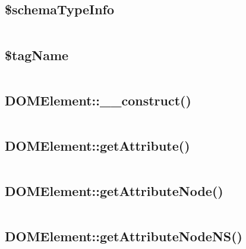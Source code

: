 \subsection{\$schemaTypeInfo}

\begin{lstlisting}[language=PHP]

\end{lstlisting}

\subsection{\$tagName}


\begin{lstlisting}[language=PHP]

\end{lstlisting}

\subsection{DOMElement::\_\_construct()}


\begin{lstlisting}[language=PHP]

\end{lstlisting}

\subsection{DOMElement::getAttribute()}

\begin{lstlisting}[language=PHP]

\end{lstlisting}

\subsection{DOMElement::getAttributeNode()}

\begin{lstlisting}[language=PHP]

\end{lstlisting}

\subsection{DOMElement::getAttributeNodeNS()}

\begin{lstlisting}[language=PHP]

\end{lstlisting}


